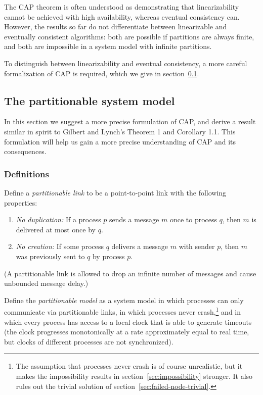\documentclass[a4paper,twocolumn,10pt]{article}
\begin{document}
The CAP theorem is often understood as demonstrating that linearizability cannot be achieved with
high availability, whereas eventual consistency can. However, the results so far do not
differentiate between linearizable and eventually consistent algorithms: both are possible if
partitions are always finite, and both are impossible in a system model with infinite partitions.

To distinguish between linearizability and eventual consistency, a more careful formalization of CAP
is required, which we give in section~\ref{sec:partitionable-model}.

\subsection{The partitionable system model}\label{sec:partitionable-model}

In this section we suggest a more precise formulation of CAP, and derive a result similar in spirit
to Gilbert and Lynch's Theorem 1 and Corollary 1.1. This formulation will help us gain a more
precise understanding of CAP and its consequences.

\subsubsection{Definitions}

Define a \emph{partitionable link} to be a point-to-point link with the following properties:
\begin{enumerate}
    \item \emph{No duplication:} If a process $p$ sends a message $m$ once to process $q$, then $m$
        is delivered at most once by $q$.
    \item \emph{No creation:} If some process $q$ delivers a message $m$ with sender $p$, then $m$
        was previously sent to $q$ by process $p$.
\end{enumerate}
(A partitionable link is allowed to drop an infinite number of messages and cause unbounded message
delay.)

Define the \emph{partitionable model} as a system model in which processes can only communicate via
partitionable links, in which processes never crash,\footnote{The assumption that processes never
crash is of course unrealistic, but it makes the impossibility results in
section~\ref{sec:impossibility} stronger. It also rules out the trivial solution of
section~\ref{sec:failed-node-trivial}.} and in which every process has access to a local clock that
is able to generate timeouts (the clock progresses monotonically at a rate approximately equal to
real time, but clocks of different processes are not synchronized).
\end{document}
